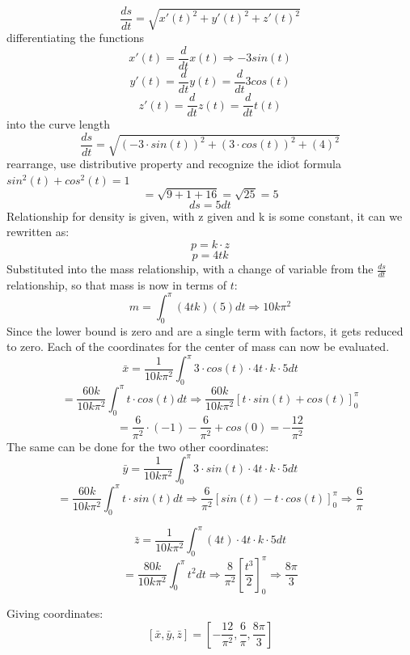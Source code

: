 \[\frac{ds}{dt} = \sqrt{x'(t)^2 + y'(t)^2 + z'(t)^2}\] 
differentiating the functions
\[x'(t) = \frac{d}{dt}x(t) \Rightarrow -3sin(t)\]
\[y'(t) = \frac{d}{dt}y(t) = \frac{d}{dt}3cos(t)\]
\[z'(t) = \frac{d}{dt}z(t) = \frac{d}{dt}t(t)\]
into the curve length
\[\frac{ds}{dt} = \sqrt{(-3\cdot sin(t))^2+(3\cdot cos(t))^2+(4)^2}\]
rearrange, use distributive property and recognize the idiot formula $sin^2(t) + cos^2(t) = 1$
\[=\sqrt{9 + 1 + 16}  = \sqrt{25} = 5\]
\[ ds = 5dt\]
Relationship for density is given, with z given and k is some constant, it can we rewritten as:
\[p = k \cdot z \]
\[p = 4tk\]
Substituted into the mass relationship, with a change of variable from the $\frac{ds}{dt}$ relationship,
so that mass is now in terms of $t$:
\[m = \int_0^\pi (4tk)(5)dt \Rightarrow 10k\pi^2\]
Since the lower bound is zero and are a single term with factors, it gets reduced to zero.
Each of the coordinates for the center of mass can now be evaluated.
\[\bar{x} = \frac{1}{10k\pi^2}\int_0^\pi 3\cdot cos(t)\cdot 4t \cdot k \cdot 5 dt\]
\[ = \frac{60k}{10k\pi^2} \int_0^\pi t\cdot cos(t)dt \Rightarrow  \frac{60k}{10k\pi^2} [t\cdot sin(t) +cos(t)]_0^\pi\]
\[= \frac{6}{\pi^2} \cdot (-1) - \frac{6}{\pi^2}+cos(0)=-\frac{12}{\pi^2}\]
The same can be done for the two other coordinates:
\[\bar{y} = \frac{1}{10k\pi^2}\int_0^\pi 3\cdot sin(t)\cdot 4t \cdot k \cdot 5 dt\]
\[ = \frac{60k}{10k\pi^2} \int_0^\pi t \cdot sin(t)dt \Rightarrow 
\frac{6}{\pi^2}[sin(t) - t\cdot cos(t)]_0^\pi \Rightarrow \frac{6}{\pi}\]

\[\bar{z} = \frac{1}{10k\pi^2}\int_0^\pi (4t)\cdot 4t \cdot k \cdot 5 dt\]
\[ = \frac{80k}{10k\pi^2} \int_0^\pi t^2 dt \Rightarrow 
\frac{8}{\pi^2}[\frac{t^3}{2}]_0^\pi \Rightarrow \frac{8\pi}{3}\]

Giving coordinates:
\[[\bar{x}, \bar{y}, \bar{z}] = [-\frac{12}{\pi^2}, \frac{6}{\pi}, \frac{8\pi}{3} ]\]



